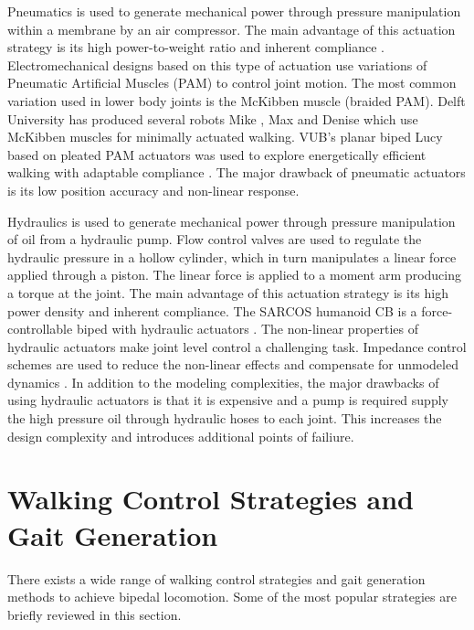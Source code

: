 Pneumatics is used to generate mechanical power through pressure manipulation within a membrane by an air compressor. The main advantage of this actuation strategy is its high power-to-weight ratio and inherent compliance \cite{Wisse2007}. Electromechanical designs based on this type of actuation use variations of Pneumatic Artificial Muscles (PAM) to control joint motion. The most common variation used in lower body joints is the McKibben muscle (braided PAM). Delft University has produced several robots Mike \cite{Wisse2003}, Max \cite{Hobbelen2005} and Denise \cite{Hobbelen2008,Wisse:2007wh} which use McKibben muscles for minimally actuated walking. VUB's planar biped Lucy based on pleated PAM actuators was used to explore energetically efficient walking with adaptable compliance \cite{Vanderborght:2005kq}. The major drawback of pneumatic actuators is its low position accuracy and non-linear response. 

Hydraulics is used to generate mechanical power through pressure manipulation of oil from a hydraulic pump. Flow control valves are used to regulate the hydraulic pressure in a hollow cylinder, which in turn manipulates a linear force applied through a piston. The linear force is applied to a moment arm producing a torque at the joint. The main advantage of this actuation strategy is its high power density and inherent compliance. The SARCOS humanoid CB is a force-controllable biped with hydraulic actuators \cite{SangHoHyon:2007jy}. The non-linear properties of hydraulic actuators make joint level control a challenging task. Impedance control schemes are used to reduce the non-linear effects and compensate for unmodeled dynamics \cite{Bilodeau1998}. In addition to the modeling complexities, the major drawbacks of using hydraulic actuators is that it is expensive and a pump is required supply the high pressure oil through hydraulic hoses to each joint. This increases the design complexity and introduces additional points of failiure. 








\section{Walking Control Strategies and Gait Generation} %
\label{sec:related_control_strategies}
There exists a wide range of walking control strategies and gait generation methods to achieve bipedal locomotion. Some of the most popular strategies are briefly reviewed in this section.


